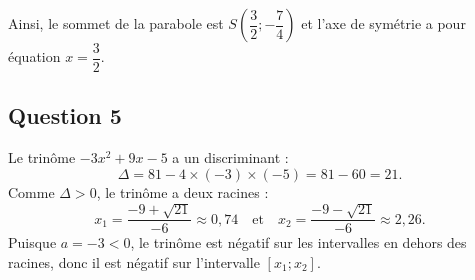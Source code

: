 	Ainsi, le sommet de la parabole est $S\left( \dfrac{3}{2} ; -\dfrac{7}{4} \right)$ et l'axe de symétrie a pour équation $x = \dfrac{3}{2}$.
	
	\subsection*{Question 5}
	
	Le trinôme $-3x^2 + 9x - 5$ a un discriminant :
	\[
	\Delta = 81 - 4 \times (-3) \times (-5) = 81 - 60 = 21.
	\]
	Comme $\Delta > 0$, le trinôme a deux racines :
	\[
	x_1 = \dfrac{-9 + \sqrt{21}}{-6} \approx 0,74 \quad \text{et} \quad x_2 = \dfrac{-9 - \sqrt{21}}{-6} \approx 2,26.
	\]
	Puisque $a = -3 < 0$, le trinôme est négatif sur les intervalles en dehors des racines, donc il est négatif sur l'intervalle $[x_1 ; x_2]$.
